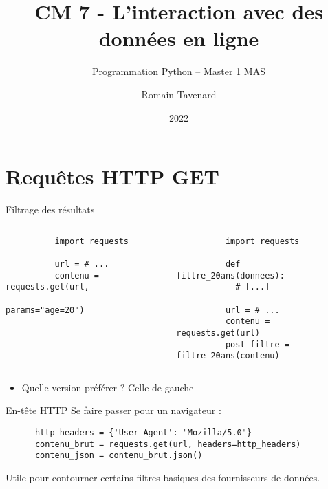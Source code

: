 \documentclass[10pt]{beamer}
\title[M1 MAS -- Python -- Fichiers]{CM 7 - L'interaction avec des données en ligne}
\subtitle{Programmation Python -- Master 1 MAS}
\author{Romain Tavenard}
\date{2022}
\institute{%
\hypersetup{urlcolor=.}
\makebox[2.2ex][c]{\faEnvelope}\enspace\href{mailto:romain.tavenard@univ-rennes2.fr}{\texttt{romain.tavenard@univ-rennes2.fr}}\\%
}
\begin{document}
\maketitle

\section{Requêtes HTTP GET}

\begin{frame}[fragile]{Filtrage des résultats}
  \begin{columns}
    \begin{column}{0.48\textwidth}
      \begin{beamercodeblock}
        \begin{verbatim}
          import requests

          url = # ...
          contenu = requests.get(url, 
                        params="age=20")
        \end{verbatim}
      \end{beamercodeblock}        
    \end{column} \hfill
    \begin{column}{0.48\textwidth}
      \begin{beamercodeblock}
        \begin{verbatim}
          import requests

          def filtre_20ans(donnees):
            # [...]

          url = # ...
          contenu = requests.get(url)
          post_filtre = filtre_20ans(contenu)
        \end{verbatim}
      \end{beamercodeblock}        
    \end{column}
  \end{columns}
  \begin{itemize}
    \item Quelle version préférer ? \pause \alert{Celle de gauche}
  \end{itemize}

\end{frame}

\begin{frame}[fragile]{En-tête HTTP}
  Se faire passer pour un navigateur :
  \begin{beamercodeblock}
    \begin{verbatim}
      http_headers = {'User-Agent': "Mozilla/5.0"}
      contenu_brut = requests.get(url, headers=http_headers)
      contenu_json = contenu_brut.json()
    \end{verbatim}
  \end{beamercodeblock}

  Utile pour contourner certains filtres basiques des fournisseurs de données.
\end{frame}
\end{document}
